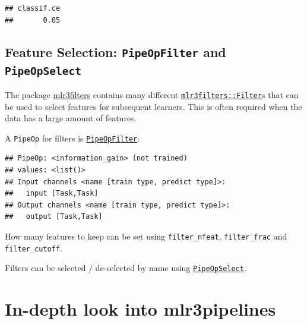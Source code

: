 \documentclass[]{scrbook}
\newenvironment{Shaded}{\begin{snugshade}}{\end{snugshade}}
\newcommand{\KeywordTok}[1]{\textcolor[rgb]{0.13,0.29,0.53}{\textbf{#1}}}
\newcommand{\NormalTok}[1]{#1}
\newcommand{\OperatorTok}[1]{\textcolor[rgb]{0.81,0.36,0.00}{\textbf{#1}}}
\renewenvironment{Shaded} {\begin{snugshade}\small} {\end{snugshade}}
\begin{document}
\begin{verbatim}
## classif.ce 
##       0.05
\end{verbatim}

\hypertarget{feature-selection-pipeopfilter-and-pipeopselect}{%
\subsection{\texorpdfstring{Feature Selection: \texttt{PipeOpFilter} and \texttt{PipeOpSelect}}{Feature Selection: PipeOpFilter and PipeOpSelect}}\label{feature-selection-pipeopfilter-and-pipeopselect}}

The package \href{https://mlr3filters.mlr-org.com}{mlr3filters} contains many different \href{https://mlr3filters.mlr-org.com/reference/Filter.html}{\texttt{mlr3filters::Filter}}s that can be used to select features for subsequent learners.
This is often required when the data has a large amount of features.

A \texttt{PipeOp} for filters is \href{https://mlr3pipelines.mlr-org.com/reference/mlr_pipeops_filter.html}{\texttt{PipeOpFilter}}:

\begin{Shaded}
\end{Shaded}

\begin{verbatim}
## PipeOp: <information_gain> (not trained)
## values: <list()>
## Input channels <name [train type, predict type]>:
##   input [Task,Task]
## Output channels <name [train type, predict type]>:
##   output [Task,Task]
\end{verbatim}

How many features to keep can be set using \texttt{filter\_nfeat}, \texttt{filter\_frac} and \texttt{filter\_cutoff}.

Filters can be selected / de-selected by name using \href{https://mlr3pipelines.mlr-org.com/reference/mlr_pipeops_select.html}{\texttt{PipeOpSelect}}.

\hypertarget{in-depth-pipelines}{%
\section{In-depth look into mlr3pipelines}\label{in-depth-pipelines}}
\end{document}
